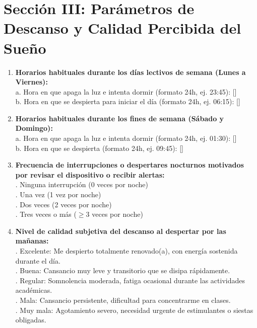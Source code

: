 \documentclass[12pt, letterpaper]{article}
\begin{document}
\section*{Sección III: Parámetros de Descanso y Calidad Percibida del Sueño}

\begin{enumerate}[leftmargin=*, resume]
    \item \textbf{Horarios habituales durante los días lectivos de semana (Lunes a Viernes):} \\
    a. Hora en que apaga la luz e intenta dormir (formato 24h, ej. 23:45): [\hspace{2.5cm}] \\
    b. Hora en que se despierta para iniciar el día (formato 24h, ej. 06:15): [\hspace{2.5cm}]

    \item \textbf{Horarios habituales durante los fines de semana (Sábado y Domingo):} \\
    a. Hora en que apaga la luz e intenta dormir (formato 24h, ej. 01:30): [\hspace{2.5cm}] \\
    b. Hora en que se despierta (formato 24h, ej. 09:45): [\hspace{2.5cm}]

    \item \textbf{Frecuencia de interrupciones o despertares nocturnos motivados por revisar el dispositivo o recibir alertas:} \\
    . Ninguna interrupción (0 veces por noche) \\
    . Una vez (1 vez por noche) \\
    . Dos veces (2 veces por noche) \\
    . Tres veces o más ($\ge 3$ veces por noche)

    \item \textbf{Nivel de calidad subjetiva del descanso al despertar por las mañanas:} \\
    . Excelente: Me despierto totalmente renovado(a), con energía sostenida durante el día. \\
    . Buena: Cansancio muy leve y transitorio que se disipa rápidamente. \\
    . Regular: Somnolencia moderada, fatiga ocasional durante las actividades académicas. \\
    . Mala: Cansancio persistente, dificultad para concentrarme en clases. \\
    . Muy mala: Agotamiento severo, necesidad urgente de estimulantes o siestas obligadas.
\end{enumerate}
\end{document}
